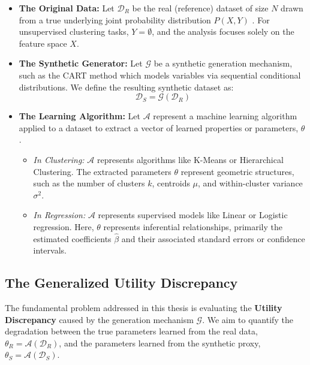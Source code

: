 \begin{itemize}
    \item \textbf{The Original Data:} Let $\mathcal{D}_{R}$ be the real (reference) dataset of size $N$ drawn from a true underlying joint probability distribution $P(X, Y)$ \cite{nowok2016}. For unsupervised clustering tasks, $Y = \emptyset$, and the analysis focuses solely on the feature space $X$.
    \item \textbf{The Synthetic Generator:} Let $\mathcal{G}$ be a synthetic generation mechanism, such as the CART method which models variables via sequential conditional distributions. We define the resulting synthetic dataset as:
    \begin{equation}
        \mathcal{D}_{S} = \mathcal{G}(\mathcal{D}_{R})
    \end{equation}
    \item \textbf{The Learning Algorithm:} Let $\mathcal{A}$ represent a machine learning algorithm applied to a dataset to extract a vector of learned properties or parameters, $\theta$.
    \begin{itemize}
        \item \textit{In Clustering:} $\mathcal{A}$ represents algorithms like K-Means or Hierarchical Clustering. The extracted parameters $\theta$ represent geometric structures, such as the number of clusters $k$, centroids $\mu$, and within-cluster variance $\sigma^{2}$.
        \item \textit{In Regression:} $\mathcal{A}$ represents supervised models like Linear or Logistic regression. Here, $\theta$ represents inferential relationships, primarily the estimated coefficients $\hat{\beta}$ and their associated standard errors or confidence intervals.
    \end{itemize}
\end{itemize}

\subsection{The Generalized Utility Discrepancy}
The fundamental problem addressed in this thesis is evaluating the \textbf{Utility Discrepancy} caused by the generation mechanism $\mathcal{G}$. We aim to quantify the degradation between the true parameters learned from the real data, $\theta_{R} = \mathcal{A}(\mathcal{D}_{R})$, and the parameters learned from the synthetic proxy, $\theta_{S} = \mathcal{A}(\mathcal{D}_{S})$.

